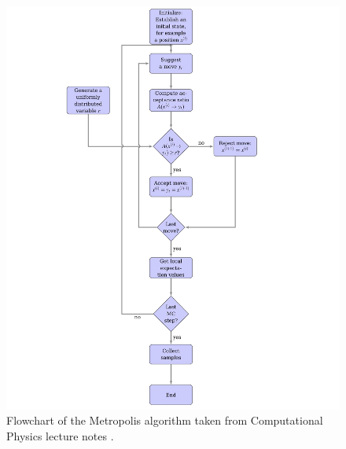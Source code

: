 \documentclass[english,notitlepage,reprint,nofootinbib]{revtex4-1}  %
\begin{document}
\begin{figure}[H]
    \centering
    \includegraphics[width=1\textwidth]{../figures//metro_flow.pdf}
    \caption{Flowchart of the Metropolis algorithm taken from Computational Physics lecture notes \cite{compedium}.}
    \label{fig:metro_flow}
\end{figure}
\end{document}

